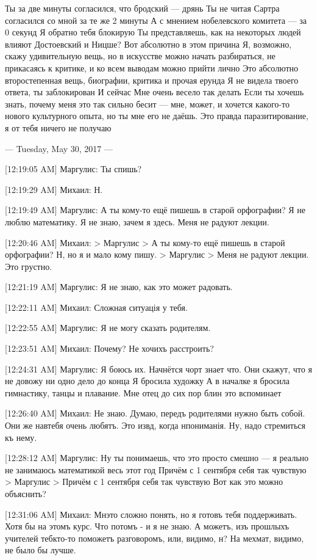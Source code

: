 \documentclass{article}
\newcommand{\yat}{{\fontencoding{X2}\selectfont\cyryat}} %
\begin{document}
{ Ты за две минуты согласился, что бродский — дрянь
 Ты не читая Сартра согласился со мной за те же 2 минуты 
А с мнением нобелевского комитета — за 0 секунд
 Я обратно тебя блокирую
 Ты представляешь, как на некоторых людей влияют Достоевский и Ницше?
 Вот абсолютно в этом причина
 Я, возможно, скажу удивительную вещь, но в искусстве можно начать разбираться, не прикасаясь к критике, и ко всем выводам можно прийти лично
 Это абсолютно второстепенная вещь, биографии, критика и прочая ерунда
 Я не видела твоего ответа, ты заблокирован
 И сейчас
 Мне очень весело так делать
 Если ты хочешь знать, почему меня это так сильно бесит — мне, может, и хочется какого-то нового культурного опыта, но ты мне его не даёшь. Это правда паразитирование, я от тебя ничего не получаю

--- Tuesday, May 30, 2017 ---

[12:19:05 AM] Маргулис:
Ты спишь?

[12:19:29 AM] Михаил:
Н.

[12:19:49 AM] Маргулис:
А ты кому-то ещё пишешь в старой орфографии?
 Я не люблю математику.
 Я не знаю, зачем я здесь.
 Меня не радуют лекции.

[12:20:46 AM] Михаил:
> Маргулис
> А ты кому-то ещё пишешь в старой орфографии?
Н, но я и мало кому пишу.
> Маргулис
> Меня не радуют лекции.
Это грустно.

[12:21:19 AM] Маргулис:
Я не знаю, как это может радовать.

[12:22:11 AM] Михаил:
Сложная ситуація у тебя.

[12:22:55 AM] Маргулис:
Я не могу сказать родителям.

[12:23:51 AM] Михаил:
Почему? Не хоч ихъ расстроить?

[12:24:31 AM] Маргулис:
Я боюсь их. Начнётся чорт знает что. Они скажут, что я не довожу ни одно дело до конца
 Я бросила художку
 А в началке я бросила гимнастику, танцы и плавание. Мне отец до сих пор блин это вспоминает

[12:26:40 AM] Михаил:
Не знаю. Думаю, передъ родителями нужно быть собой. Они же нав тебя очень любятъ.
 Это изв д, когда н пониманія. Ну, надо стремиться къ нему.

[12:28:12 AM] Маргулис:
Ну ты понимаешь, что это просто смешно — я реально не занимаюсь математикой весь этот год
 Причём с 1 сентября себя так чувствую
> Маргулис
> Причём с 1 сентября себя так чувствую
Вот как это можно объяснить?

[12:31:06 AM] Михаил:
Мн\yat это сложно понять, но я готовъ тебя поддерживать. Хотя бы на этомъ курс\yat. Что потомъ - и я не знаю. А можетъ, изъ прошлыхъ учителей теб\yat кто-то поможетъ разговоромъ, или, видимо, н?
 На мехмат\yat, видимо, не было бы лучше.

}
\end{document}
